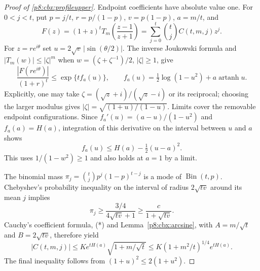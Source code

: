 \documentclass[11pt,a4paper]{article}
\theoremstyle{definition}
\theoremstyle{remark}
\numberwithin{equation}{section}
\begin{document}
\begin{proof}[Proof of \eqref{p8:cbx:profileupper}]
Endpoint coefficients have absolute value one. For $0<j<t$, put
$p=j/t$, $r=p/(1-p)$, $v=p(1-p)$, $a=m/t$, and
\[
 F(z)=(1+z)^tT_m\left(\frac{z-1}{z+1}\right)
      =\sum_{j=0}^t\binom tjC(t,m,j)z^j.
\]
For $z=re^{i\theta}$ set $u=2\sqrt v\,|\sin(\theta/2)|$.
The inverse Joukowski formula and $|T_m(w)|\le|\zeta|^m$ when
$w=(\zeta+\zeta^{-1})/2$, $|\zeta|\ge1$, give
\[
 \frac{|F(re^{i\theta})|}{(1+r)^t}
 \le \exp\{t f_a(u)\},\qquad
 f_a(u)=\tfrac12\log(1-u^2)+a\operatorname{artanh}u.
\]
Explicitly, one may take
$\zeta=(\sqrt z+i)/(\sqrt z-i)$ or its reciprocal; choosing
the larger modulus gives $|\zeta|=\sqrt{(1+u)/(1-u)}$.
Limits cover the removable endpoint configurations. Since
$f_a'(u)=(a-u)/(1-u^2)$ and $f_a(a)=H(a)$,
integration of this derivative on the interval between $u$ and $a$
shows
\[
                 f_a(u)\le H(a)-\tfrac12(u-a)^2.             \tag{*}
\]
This uses $1/(1-w^2)\ge1$ and also holds at $a=1$ by a limit.

The binomial mass $\pi_j=\binom tjp^j(1-p)^{t-j}$ is a mode of
$\operatorname{Bin}(t,p)$. Chebyshev's probability inequality on
the interval of radius $2\sqrt{tv}$ around its mean $j$ implies
\[
 \pi_j\ge \frac{3/4}{4\sqrt{tv}+1}
                     \ge\frac{c}{1+\sqrt{tv}}.
\]
Cauchy's coefficient formula, (*) and Lemma~\ref{p8:cbx:arcsine}, with
$A=m/\sqrt t$ and $B=2\sqrt{tv}$, therefore yield
\[
 |C(t,m,j)|\le K e^{tH(a)}\sqrt{1+m/\sqrt t}
      \le K(1+m^2/t)^{1/4}e^{tH(a)}.
\]
The final inequality follows from $(1+u)^2\le2(1+u^2)$.
\end{proof}
\end{document}
